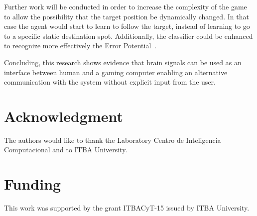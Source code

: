 \documentclass[journal]{IEEEtran}
\begin{document}
{{Further work will be conducted in order to increase the complexity of the game to allow the possibility that the target position be dynamically changed.  In that case the agent would start to learn to follow the target, instead of learning to go to a specific static destination spot.  Additionally, the classifier could be enhanced to recognize more effectively the Error Potential~\cite{Iwane2017}.

Concluding, this research shows evidence that brain signals can be used as an interface between human and a gaming computer enabling an alternative communication with the system without explicit input from the user.




%

\section*{Acknowledgment}

The authors would like to thank the Laboratory Centro de Inteligencia Computacional and to ITBA University.

\section*{Funding}
This work was supported by the grant ITBACyT-15 issued by ITBA University.

}}
\end{document}
